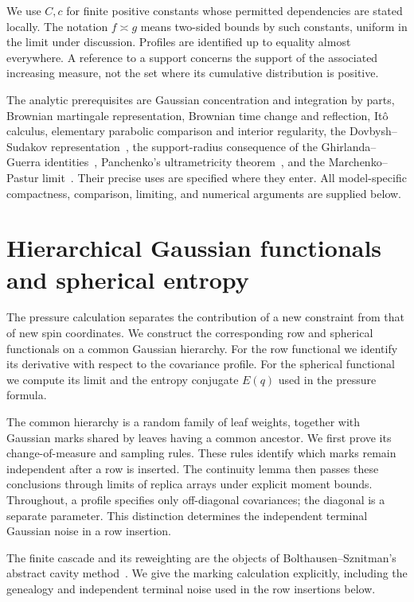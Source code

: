 \documentclass[11pt,a4paper]{article}
\numberwithin{equation}{section}
\theoremstyle{definition}
\theoremstyle{remark}
\begin{document}
We use $C,c$ for finite positive constants whose permitted dependencies are stated locally. The notation $f\asymp g$ means two-sided bounds by such constants, uniform in the limit under discussion. Profiles are identified up to equality almost everywhere. A reference to a support concerns the support of the associated increasing measure, not the set where its cumulative distribution is positive.

The analytic prerequisites are Gaussian concentration and integration by parts, Brownian martingale representation, Brownian time change and reflection, It\^o calculus, elementary parabolic comparison and interior regularity, the Dovbysh--Sudakov representation~\cite{Panchenko2010DS}, the support-radius consequence of the Ghirlanda--Guerra identities~\cite{Panchenko2010Sphere}, Panchenko's ultrametricity theorem~\cite{Panchenko2013}, and the Marchenko--Pastur limit~\cite{MarcenkoPastur1967}. Their precise uses are specified where they enter. All model-specific compactness, comparison, limiting, and numerical arguments are supplied below.


\tableofcontents
\section{Hierarchical Gaussian functionals and spherical entropy}
\label{sec:hierarchy}

The pressure calculation separates the contribution of a new constraint
from that of new spin coordinates.  We construct the corresponding row
and spherical functionals on a common Gaussian hierarchy.  For the row
functional we identify its derivative with respect to the covariance
profile.  For the spherical functional we compute its limit and the
entropy conjugate $E(q)$ used in the pressure formula.

The common hierarchy is a random family of leaf weights, together with
Gaussian marks shared by leaves having a common ancestor.  We first prove
its change-of-measure and sampling rules.  These rules identify which
marks remain independent after a row is inserted.  The continuity lemma
then passes these conclusions through limits of replica arrays under
explicit moment bounds.  Throughout, a profile specifies only
off-diagonal covariances; the diagonal is a separate parameter.  This
distinction determines the independent terminal Gaussian noise in a row
insertion.

The finite cascade and its reweighting are the objects of
Bolthausen--Sznitman's abstract cavity method~\cite{BolthausenSznitman1998}.
We give the marking calculation explicitly, including the genealogy and
independent terminal noise used in the row insertions below.
\end{document}
